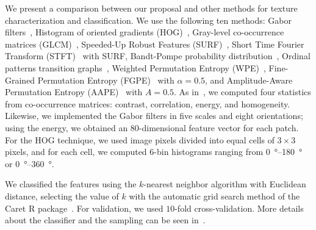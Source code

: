 \documentclass[journal]{IEEEtran}
\begin{document}
	We present a comparison between our proposal and other methods for texture characterization and classification.
	We use the following ten methods: 
	Gabor filters~\cite{weldon1996efficient},  
	Histogram of oriented gradients (HOG)~\cite{dalal2005histograms},
	Gray-level co-occurrence matrices (GLCM)~\cite{kourgli2012texture}, 
	Speeded-Up Robust Features (SURF)~\cite{bay2006surf},
	Short Time Fourier Transform (STFT)~\cite{portnoff1980time} with SURF,
	Bandt-Pompe probability distribution~\cite{Bandt2002Permutation}, 
	Ordinal patterns transition graphs~\cite{Borges2019Transition},
	Weighted Permutation Entropy (WPE)~\cite{Fadlallah2013Weightedpermutation},
	Fine-Grained Permutation Entropy (FGPE)~\cite{xiao2009fine} with $\alpha = 0.5$, and
	Amplitude-Aware Permutation Entropy (AAPE)~\cite{azami2016amplitude} with $A = 0.5$.
	As in~\cite{guan2019covariance}, 
	we computed four statistics from co-occurrence matrices: contrast, correlation, energy, and homogeneity.
	Likewise, we implemented the Gabor filters in five scales and eight orientations; using the energy, we obtained an $80$-dimensional feature vector for each patch.
	For the HOG technique, we used image pixels divided into equal cells of $3 \times 3$ pixels, and for each cell, we computed 6-bin histograms ranging from \SIrange{0}{180}{\degree} or \SIrange{0}{360}{\degree}.
	
	We classified the features using the $k$-nearest neighbor algorithm with Euclidean distance, selecting the value of $k$ with the automatic grid search method of the Caret R package~\cite{kuhn2008building}.
	For validation, we used $10$-fold cross-validation.
	More details about the classifier and the sampling can be seen in~\cite{mitchell1997machine}.
	
\end{document}
